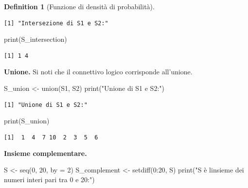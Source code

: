 \documentclass[
  letterpaper,
  DIV=11,
  numbers=noendperiod,
  oneside]{scrreprt}
\newenvironment{Shaded}{\begin{snugshade}}{\end{snugshade}}
\newcommand{\AttributeTok}[1]{\textcolor[rgb]{0.40,0.45,0.13}{#1}}
\newcommand{\DecValTok}[1]{\textcolor[rgb]{0.68,0.00,0.00}{#1}}
\newcommand{\FunctionTok}[1]{\textcolor[rgb]{0.28,0.35,0.67}{#1}}
\newcommand{\NormalTok}[1]{\textcolor[rgb]{0.00,0.23,0.31}{#1}}
\newcommand{\OtherTok}[1]{\textcolor[rgb]{0.00,0.23,0.31}{#1}}
\newcommand{\SpecialCharTok}[1]{\textcolor[rgb]{0.37,0.37,0.37}{#1}}
\newcommand{\StringTok}[1]{\textcolor[rgb]{0.13,0.47,0.30}{#1}}
\theoremstyle{definition}
\theoremstyle{plain}
\theoremstyle{definition}
\newtheorem{definition}{Definition}[chapter]
\theoremstyle{remark}
\begin{document}
\begin{definition}[Funzione di densità di
probabilità]
\begin{verbatim}
[1] "Intersezione di S1 e S2:"
\end{verbatim}

\begin{Shaded}
\begin{Highlighting}[]
\FunctionTok{print}\NormalTok{(S\_intersection)}
\end{Highlighting}
\end{Shaded}

\begin{verbatim}
[1] 1 4
\end{verbatim}

\textbf{Unione.} Si noti che il connettivo logico \texttt{\textbar{}}
corrisponde all'unione.

\begin{Shaded}
\begin{Highlighting}[]
\NormalTok{S\_union }\OtherTok{\textless{}{-}} \FunctionTok{union}\NormalTok{(S1, S2)}
\FunctionTok{print}\NormalTok{(}\StringTok{"Unione di S1 e S2:"}\NormalTok{)}
\end{Highlighting}
\end{Shaded}

\begin{verbatim}
[1] "Unione di S1 e S2:"
\end{verbatim}

\begin{Shaded}
\begin{Highlighting}[]
\FunctionTok{print}\NormalTok{(S\_union)}
\end{Highlighting}
\end{Shaded}

\begin{verbatim}
[1]  1  4  7 10  2  3  5  6
\end{verbatim}

\textbf{Insieme complementare.}

\begin{Shaded}
\begin{Highlighting}[]
\NormalTok{S }\OtherTok{\textless{}{-}} \FunctionTok{seq}\NormalTok{(}\DecValTok{0}\NormalTok{, }\DecValTok{20}\NormalTok{, }\AttributeTok{by =} \DecValTok{2}\NormalTok{)}
\NormalTok{S\_complement }\OtherTok{\textless{}{-}} \FunctionTok{setdiff}\NormalTok{(}\DecValTok{0}\SpecialCharTok{:}\DecValTok{20}\NormalTok{, S)}
\FunctionTok{print}\NormalTok{(}\StringTok{"S è l\textquotesingle{}insieme dei numeri interi pari tra 0 e 20:"}\NormalTok{)}
\end{Highlighting}
\end{Shaded}


\end{definition}
\end{document}

